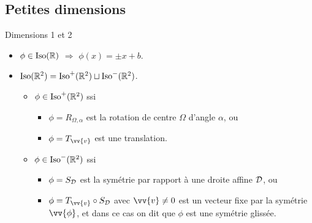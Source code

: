 \documentclass[bigger]{m53beamer}
\begin{document}
\subsection{Petites dimensions}
\begin{frame}{Dimensions 1 et 2}
  \begin{itemize}[<+(1)->]
    \item $\phi \in \operatorname{Iso}(\mathbb{R})$ $\Rightarrow$ $\phi(x) = \pm x +b$.\pause\\
    \item $\operatorname{Iso}(\mathbb{R}^{2}) = \operatorname{Iso}^{+}(\mathbb{R}^{2}) \sqcup \operatorname{Iso}^{-}(\mathbb{R}^{2})$.
      \begin{itemize}[<+(1)->]
        \item $\phi\in\operatorname{Iso}^{+}(\mathbb{R}^{2})$ ssi\pause
          \begin{itemize}[<.(1)->]
            \item $\phi = R_{\Omega,\alpha}$ est la rotation de centre $\Omega$ d'angle $\alpha$\pause, ou
            \item $\phi = T_{\vv{v}}$ est une translation.
          \end{itemize}
        \item $\phi\in\operatorname{Iso}^{-}(\mathbb{R}^{2})$ ssi\pause
          \begin{itemize}[<.(1)->]
            \item $\phi = S_{\mathcal{D}}$ est la symétrie par rapport à une droite affine $\mathcal{D}$\pause, ou
            \item $\phi = T_{\vv{v}}\circ S_{\ens{D}}$ avec $\vv{v}\neq0$ est un vecteur fixe par la symétrie $\vv{\phi}$\pause, et dans ce cas on dit que $\phi$ est une \alert{symétrie glissée}.
          \end{itemize}
      \end{itemize}\pause
  \end{itemize}
\end{frame}
\end{document}
